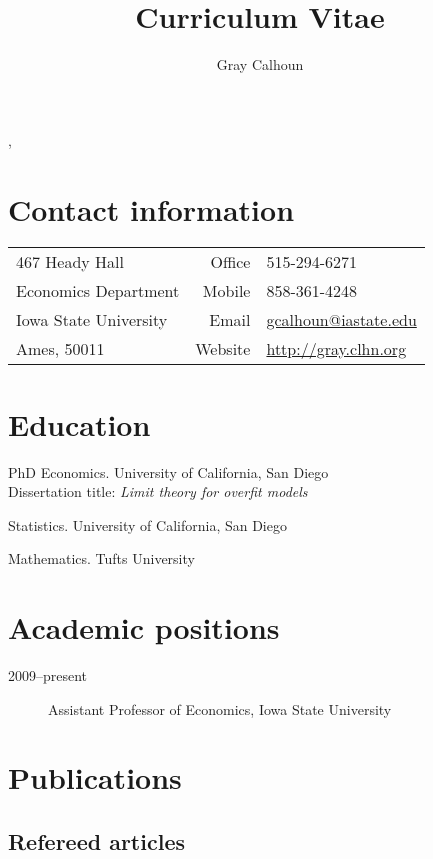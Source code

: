 \documentclass[12pt]{article}%
\author{Gray Calhoun}
\title{Curriculum Vitae}
\makeatletter
\newcommand{\allcaps}[1]{\textls{\MakeUppercase{#1}}}
\def\maketitle{%
\begin{center}%
\par{\textls{\MakeUppercase{\textbf{\@author}}}}%
\vspace{\itemsep}%
\par{\@title, \@date}%
\end{center}%
}
\makeatother
\begin{document}
\maketitle

\section*{Contact information}
\begin{tabular}{@{}lrl@{}}
 467 Heady Hall            & Office  & 515-294-6271              \\
 Economics Department      & Mobile  & 858-361-4248              \\
 Iowa State University     & Email   & \url{gcalhoun@iastate.edu}\\
 Ames, \allcaps{IA} 50011  & Website & \url{http://gray.clhn.org}
\end{tabular}

\section*{Education}

\begin{description}[noitemsep]
\item[2009] PhD Economics. University of California, San Diego \\
Dissertation title: \textit{Limit theory for overfit models}
\item[2006] \allcaps{MS} Statistics. University of California, San Diego
\item[2001] \allcaps{BA} Mathematics. Tufts University
\end{description}

\section*{Academic positions}

\begin{description}
\item[2009--present] Assistant Professor of Economics, Iowa State University
\end{description}

\section*{Publications}
\subsection*{Refereed articles}
\end{document}
